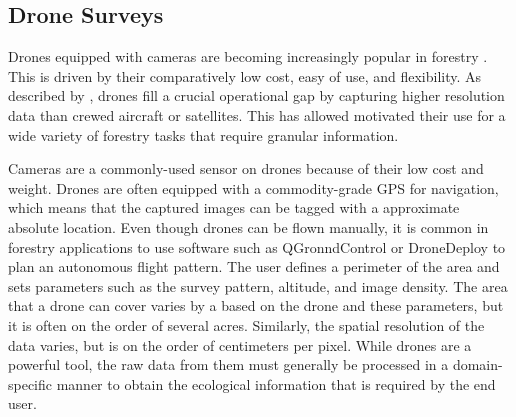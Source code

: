 \subsection{Drone Surveys}
Drones equipped with cameras are becoming increasingly popular in forestry \cite{CristanDronesManagement,Tang2015DronePractices}. This is driven by their comparatively low cost, easy of use, and flexibility. As described by \cite{Tang2015DronePractices}, drones fill a crucial operational gap by capturing higher resolution data than crewed aircraft or satellites. This has allowed motivated their use for a wide variety of forestry tasks that require granular information.

Cameras are a commonly-used sensor on drones because of their low cost and weight. Drones are often equipped with a commodity-grade GPS for navigation, which means that the captured images can be tagged with a approximate absolute location. Even though drones can be flown manually, it is common in forestry applications to use software such as QGronndControl or DroneDeploy \cite{} to plan an autonomous flight pattern. The user defines a perimeter of the area and sets parameters such as the survey pattern, altitude, and image density. The area that a drone can cover varies by a based on the drone and these parameters, but it is often on the order of several acres. Similarly, the spatial resolution of the data varies, but is on the order of centimeters per pixel.  While drones are a powerful tool, the raw data from them must generally be processed in a domain-specific manner to obtain the ecological information that is required by the end user.  

